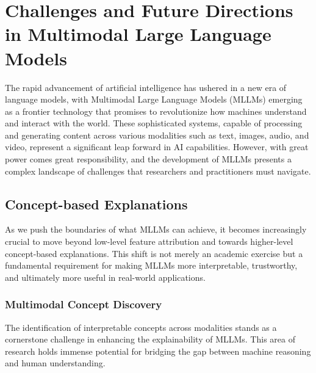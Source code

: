 \section{Challenges and Future Directions in Multimodal Large Language Models}

The rapid advancement of artificial intelligence has ushered in a new era of language models, with Multimodal Large Language Models (MLLMs) emerging as a frontier technology that promises to revolutionize how machines understand and interact with the world. These sophisticated systems, capable of processing and generating content across various modalities such as text, images, audio, and video, represent a significant leap forward in AI capabilities. However, with great power comes great responsibility, and the development of MLLMs presents a complex landscape of challenges that researchers and practitioners must navigate.

\subsection{Concept-based Explanations}
As we push the boundaries of what MLLMs can achieve, it becomes increasingly crucial to move beyond low-level feature attribution and towards higher-level concept-based explanations. This shift is not merely an academic exercise but a fundamental requirement for making MLLMs more interpretable, trustworthy, and ultimately more useful in real-world applications.

\subsubsection{Multimodal Concept Discovery}
The identification of interpretable concepts across modalities stands as a cornerstone challenge in enhancing the explainability of MLLMs. This area of research holds immense potential for bridging the gap between machine reasoning and human understanding.

